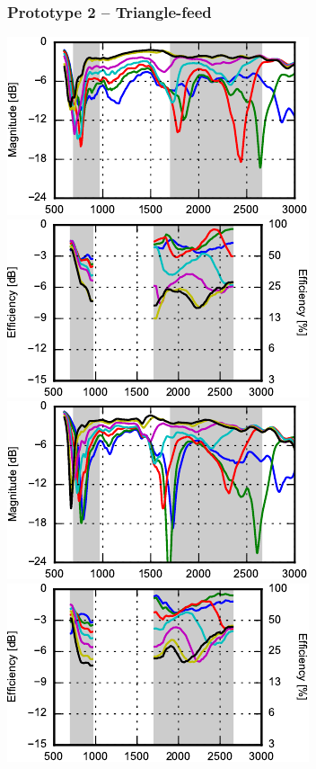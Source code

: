 \begin{frame}
    \frametitle{Prototype 2 -- Triangle-feed}
    \emptyline
    \begin{center}
        \includegraphics{img/soren/proto/design2sn/s11.pdf}
        \includegraphics{img/soren/proto/design2sn/efftop.pdf}\\
        \includegraphics{img/soren/proto/design2sn/s22.pdf}
        \includegraphics{img/soren/proto/design2sn/effside.pdf}
    \end{center}
    \legendfooter
\end{frame}

